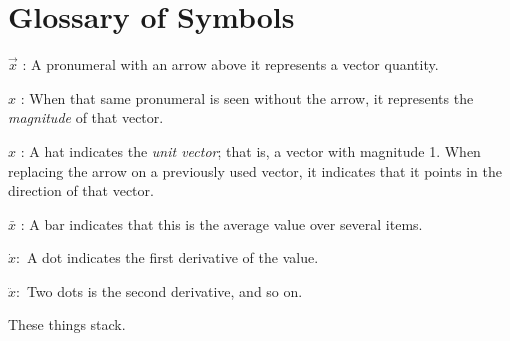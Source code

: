 \chapter{Glossary of Symbols}
	
		\begin{description}		
        	\item $\vec{x}$ : A pronumeral with an arrow above it represents a vector quantity. 		
			\item $x$ : When that same pronumeral is seen without the arrow, it represents the \textit{magnitude} of that vector.	
			\item $\hat{x}$ : A hat indicates the \textit{unit vector}; that is, a vector with magnitude 1. When replacing the arrow on a previously used vector, it indicates that it points in the direction of that vector.	
			\item $\bar{x}$ : A bar indicates that this is the average value over several items.
			\item $\dot{x}:$ A dot indicates the first derivative of the value.		
			\item $\ddot{x}:$ Two dots is the second derivative, and so on.
		
		These things stack.
        
		\end{description}
		
		
		

